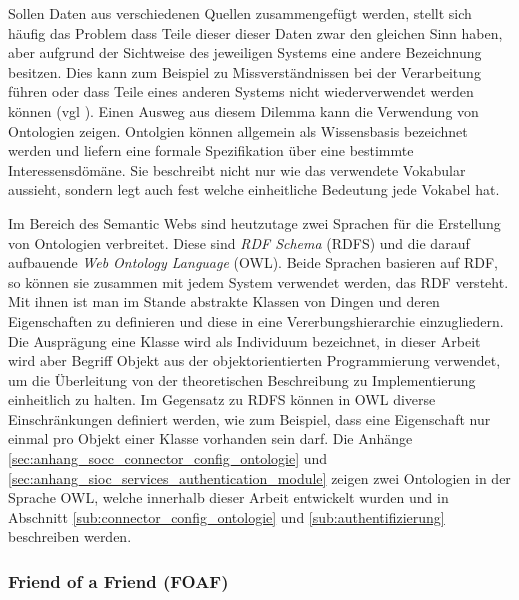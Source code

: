 Sollen Daten aus verschiedenen Quellen zusammengefügt werden, stellt sich häufig das Problem dass Teile dieser dieser Daten zwar den gleichen Sinn haben, aber aufgrund der Sichtweise des jeweiligen Systems eine andere Bezeichnung besitzen. Dies kann zum Beispiel zu Missverständnissen bei der Verarbeitung führen oder dass Teile eines anderen Systems nicht wiederverwendet werden können (vgl \cite{Uschold1996a}). Einen Ausweg aus diesem Dilemma kann die Verwendung von Ontologien zeigen. Ontolgien können allgemein als Wissensbasis \cite{Uschold1996a,Hitzler2008a} bezeichnet werden und liefern eine formale Spezifikation über eine bestimmte Interessensdömäne. Sie beschreibt nicht nur wie das verwendete Vokabular aussieht, sondern legt auch fest welche einheitliche Bedeutung jede Vokabel hat. 

Im Bereich des Semantic Webs sind heutzutage zwei Sprachen für die Erstellung von Ontologien verbreitet. Diese sind \emph{RDF Schema} (RDFS)\cite{Brickley} und die darauf aufbauende \emph{Web Ontology Language} (OWL)\cite{partelschneider2004}. Beide Sprachen basieren auf RDF, so können sie zusammen mit jedem System verwendet werden, das RDF versteht. Mit ihnen ist man im Stande abstrakte Klassen von Dingen und deren Eigenschaften zu definieren und diese in eine Vererbungshierarchie einzugliedern. Die Ausprägung eine Klasse wird als Individuum bezeichnet, in dieser Arbeit wird aber Begriff Objekt aus der objektorientierten Programmierung verwendet, um die Überleitung von der theoretischen Beschreibung zu Implementierung einheitlich zu halten. Im Gegensatz zu RDFS können in OWL diverse Einschränkungen definiert werden, wie zum Beispiel, dass eine Eigenschaft nur einmal pro Objekt einer Klasse vorhanden sein darf. Die Anhänge \ref{sec:anhang_socc_connector_config_ontologie} und \ref{sec:anhang_sioc_services_authentication_module} zeigen zwei Ontologien in der Sprache OWL, welche innerhalb dieser Arbeit entwickelt wurden und in Abschnitt \ref{sub:connector_config_ontologie} und \ref{sub:authentifizierung} beschreiben werden.

\subsubsection{Friend of a Friend (FOAF)} %
\label{ssub:friend_of_a_friend_}


